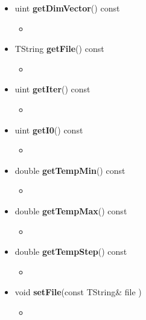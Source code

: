 \begin{itemize}
\begin{itemize}
			\item[]  uint \textbf{getDimVector}() const
			\begin{itemize}
				\item[]
			\end{itemize}

			\item[] TString \textbf{getFile}() const
			\begin{itemize}
				\item[]
			\end{itemize}

			\item[]	uint \textbf{getIter}() const
			\begin{itemize}
				\item[]
			\end{itemize}

			\item[] uint \textbf{getI0}() const
			\begin{itemize}
				\item[]
			\end{itemize}

			\item[] double \textbf{getTempMin}() const
			\begin{itemize}
				\item[]
			\end{itemize}

			\item[] double \textbf{getTempMax}() const
			\begin{itemize}
				\item[]
			\end{itemize}

			\item[] double \textbf{getTempStep}() const
			\begin{itemize}
				\item[]
			\end{itemize}


			\item[] void \textbf{setFile}(const TString\& \textunderscore file )
			\begin{itemize}
				\item[]
			\end{itemize}


\end{itemize}
\end{itemize}
